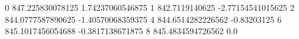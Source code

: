 0 847.225830078125 1.74237060546875
1 842.7119140625 -2.77154541015625
2 844.0777587890625 -1.40570068359375
4 844.6514282226562 -0.83203125
6 845.1017456054688 -0.3817138671875
8 845.4834594726562 0.0
